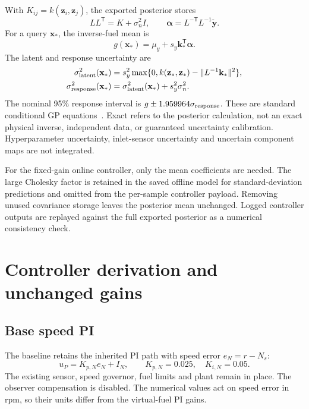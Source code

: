 \documentclass[11pt,a4paper]{article}
\begin{document}
With $K_{ij}=k(\mathbf z_i,\mathbf z_j)$, the exported posterior stores
\begin{equation}
LL^{\mathsf T}=K+\sigma_n^2I,\qquad
\boldsymbol\alpha=L^{-\mathsf T}L^{-1}\tilde{\mathbf y}.
\end{equation}
For a query $\mathbf x_*$, the inverse-fuel mean is
\begin{equation}
g(\mathbf x_*)=\mu_y+s_y\mathbf k_*^{\mathsf T}\boldsymbol\alpha.
\end{equation}
The latent and response uncertainty are
\begin{align}
\sigma_{\rm latent}^2(\mathbf x_*)&=s_y^2\max\{0,k(\mathbf z_*,\mathbf z_*)-\|L^{-1}\mathbf k_*\|^2\},\\
\sigma_{\rm response}^2(\mathbf x_*)&=\sigma_{\rm latent}^2(\mathbf x_*)+s_y^2\sigma_n^2.
\end{align}
The nominal 95\% response interval is $g\pm1.959964\sigma_{\rm response}$. These are standard conditional GP equations~\cite{gpml}. Exact refers to the posterior calculation, not an exact physical inverse, independent data, or guaranteed uncertainty calibration. Hyperparameter uncertainty, inlet-sensor uncertainty and uncertain component maps are not integrated.

For the fixed-gain online controller, only the mean coefficients are needed. The large Cholesky factor is retained in the saved offline model for standard-deviation predictions and omitted from the per-sample controller payload. Removing unused covariance storage leaves the posterior mean unchanged. Logged controller outputs are replayed against the full exported posterior as a numerical consistency check.

\clearpage
\section{Controller derivation and unchanged gains}
\subsection{Base speed PI}
The baseline retains the inherited PI path with speed error $e_N=r-N_s$:
\begin{equation}
u_P=K_{p,N}e_N+I_N,\qquad K_{p,N}=0.025,\quad K_{i,N}=0.05.
\end{equation}
The existing sensor, speed governor, fuel limits and plant remain in place. The observer compensation is disabled. The numerical values act on speed error in rpm, so their units differ from the virtual-fuel PI gains.
\end{document}
